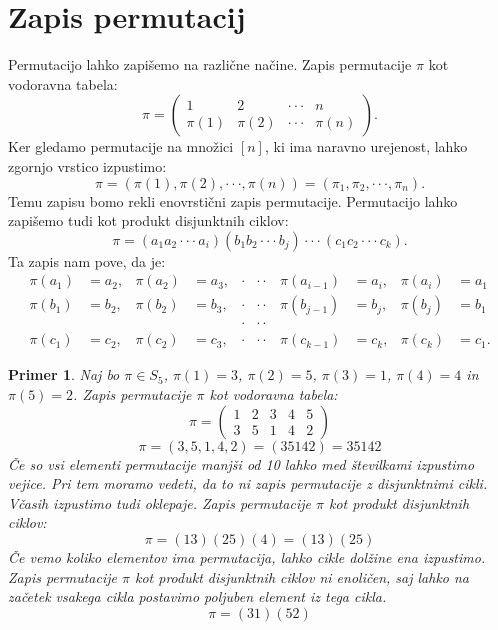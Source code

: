 \documentclass[a4paper, 12pt]{book}
\newtheorem{primer}{Primer}[chapter]
\begin{document}
\section{ Zapis permutacij }
Permutacijo lahko zapišemo na različne načine. 
Zapis permutacije $\pi$ kot vodoravna tabela:
\[
    \pi = \begin{pmatrix}
        1 & 2 & \cdot\cdot\cdot & n \\
        \pi(1) & \pi(2) & \cdot\cdot\cdot & \pi(n)
    \end{pmatrix}.
\]
Ker gledamo permutacije na množici $[n]$, ki ima naravno urejenost, lahko zgornjo vrstico izpustimo:
\[
    \pi = (\pi(1), \pi(2), \cdot\cdot\cdot, \pi(n)) = (\pi_1, \pi_2, \cdot\cdot\cdot, \pi_n).
\]
Temu zapisu bomo rekli enovrstični zapis permutacije.
Permutacijo lahko zapišemo tudi kot produkt disjunktnih ciklov:
\[
    \pi = (a_1 a_2 \cdot\cdot\cdot a_i)(b_1 b_2 \cdot\cdot\cdot b_j) \cdot\cdot\cdot (c_1 c_2 \cdot\cdot\cdot c_k).
\]
Ta zapis nam pove, da je:
\begin{align*}
    \pi(a_1) &= a_2, & \pi(a_2) &= a_3, & \cdot&\cdot\cdot & \pi(a_{i-1}) &= a_i, & \pi(a_i) &= a_1 \\
    \pi(b_1) &= b_2, & \pi(b_2) &= b_3, & \cdot&\cdot\cdot & \pi(b_{j-1}) &= b_j, & \pi(b_j) &= b_1 \\
    &&&& \cdot&\cdot\cdot \\
    \pi(c_1) &= c_2, & \pi(c_2) &= c_3, & \cdot&\cdot\cdot & \pi(c_{k-1}) &= c_k, & \pi(c_k) &= c_1.
\end{align*}

\begin{primer}
    Naj bo $\pi \in S_5$, $\pi(1) = 3$, $\pi(2) = 5$, $\pi(3) = 1$, $\pi(4) = 4$ in $\pi(5) = 2$. Zapis permutacije $\pi$ kot vodoravna tabela:
    \[
        \pi = \begin{pmatrix}
            1 & 2 & 3 & 4 & 5 \\
            3 & 5 & 1 & 4 & 2
        \end{pmatrix}
    \]
    \[
        \pi = (3, 5, 1, 4, 2) = (3 5 1 4 2) = 35142
    \]
    Če so vsi elementi permutacije manjši od 10 lahko med številkami izpustimo vejice. Pri tem moramo vedeti, da to ni zapis permutacije z disjunktnimi cikli.
    Včasih izpustimo tudi oklepaje.
    Zapis permutacije $\pi$ kot produkt disjunktnih ciklov:
    \[
        \pi = (1 3)(2 5)(4) = (1 3)(2 5)
    \]
    Če vemo koliko elementov ima permutacija, lahko cikle dolžine ena izpustimo. Zapis permutacije $\pi$ kot produkt disjunktnih ciklov ni enoličen, saj lahko na začetek vsakega cikla postavimo poljuben element iz tega cikla.
    \[
        \pi = (3 1)(5 2)
    \]
\end{primer}
\end{document}
